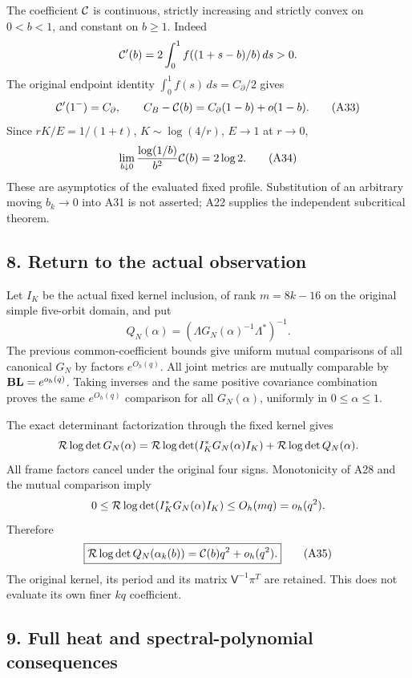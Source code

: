 \documentclass[11pt]{article}
\begin{document}
The coefficient \({\cal C}\) is continuous, strictly increasing and strictly convex on \(0<b<1\), and constant on \(b\ge1\). Indeed \[
 {\cal C}'(b)=2\int_0^1
 f((1+s-b)/b)\,ds>0.
\] The original endpoint identity \(\int_0^1f(s)\,ds=C_\partial/2\) gives \[
 {\cal C}'(1^-)=C_\partial,\qquad
 C_B-{\cal C}(b)=C_\partial(1-b)+o(1-b).
 \tag{A33}
\] Since \(rK/E=1/(1+t)\), \(K\sim\log(4/r)\), \(E\to1\) at \(r\to0\), \[
 \lim_{b\downarrow0}
 \frac{\log(1/b)}{b^2}{\cal C}(b)=2\log2.
 \tag{A34}
\] These are asymptotics of the evaluated fixed profile. Substitution of an arbitrary moving \(b_k\to0\) into A31 is not asserted; A22 supplies the independent subcritical theorem.

\subsection{8. Return to the actual observation}\label{return-to-the-actual-observation}

Let \(I_K\) be the actual fixed kernel inclusion, of rank \(m=8k-16\) on the original simple five-orbit domain, and put \[
 Q_N(\alpha)=
 (\Lambda G_N(\alpha)^{-1}\Lambda^*)^{-1}.
\] The previous common-coefficient bounds give uniform mutual comparisons of all canonical \(G_N\) by factors \(e^{O_h(q)}\). All joint metrics are mutually comparable by \({\bf B}{\bf L}=e^{o_h(q)}\). Taking inverses and the same positive covariance combination proves the same \(e^{O_h(q)}\) comparison for all \(G_N(\alpha)\), uniformly in \(0\le\alpha\le1\).

The exact determinant factorization through the fixed kernel gives \[
 {\cal R}\log\det G_N(\alpha)
 ={\cal R}\log\det(I_K^*G_N(\alpha)I_K)
  +{\cal R}\log\det Q_N(\alpha).
\] All frame factors cancel under the original four signs. Monotonicity of A28 and the mutual comparison imply \[
 0\le{\cal R}\log\det(I_K^*G_N(\alpha)I_K)
 \le O_h(mq)=o_h(q^2).
\] Therefore \[
 \boxed{
 {\cal R}\log\det Q_N(\alpha_k(b))
       ={\cal C}(b)q^2+o_h(q^2).
 }\tag{A35}
\] The original kernel, its period and its matrix \(\mathsf V^{-1}\pi^T\) are retained. This does not evaluate its own finer \(kq\) coefficient.

\subsection{9. Full heat and spectral-polynomial consequences}\label{full-heat-and-spectral-polynomial-consequences}
\end{document}
